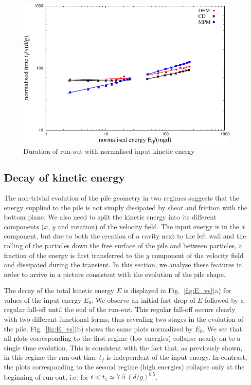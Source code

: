 \begin{figure}[tbph]
\centering
\includegraphics[width=\textwidth]{Tf_vs_Eo_Slope}
\caption{Duration of run-out with normalised input kinetic energy}
\label{fig:Tf_vs_Eo_Slope}
\end{figure}

\subsection{Decay of kinetic energy}
\label{sec:decay}

The non-trivial evolution of the pile geometry  in two regimes suggests that 
the energy supplied to the pile is not simply dissipated by shear and friction 
with the bottom plane. We also need to split the kinetic energy into its 
different components ($x$, $y$ and rotation) of the velocity field. The input 
energy is in the $x$ component, but due to both the creation of a cavity next 
to the left wall and the rolling of the particles down the free surface of the 
pile and between particles, a fraction of the energy is first transferred to 
the $y$ component of the velocity field and dissipated  during the transient. 
In this section, we analyse these features  in order to arrive in a picture 
consistent with the evolution of the pile shape.  

The decay of the total kinetic energy $E$ is displayed in 
Fig.~\ref{fig:E_vs}(a) for values of the input energy $E_0$. We observe an 
initial fast drop of $E$ followed by a regular fall-off until the end of the 
run-out. This regular fall-off occurs clearly with two different functional 
forms, thus revealing two stages in the evolution of the pile. 
Fig.~\ref{fig:E_vs}(b) shows the same plots normalized by $E_0$. We see that 
all plots corresponding to the first regime (low energies) collapse nearly on 
to a single time evolution. 
This is consistent with the fact that, as previously shown, in this 
regime the run-out time $t_f$ is independent of the input energy. In contrast, 
the plots corresponding to the second regime (high energies) collapse only at 
the beginning of run-out, i.e. for $t < t_1 \simeq 7.5 \ (d/g)^{0.5}$.   

